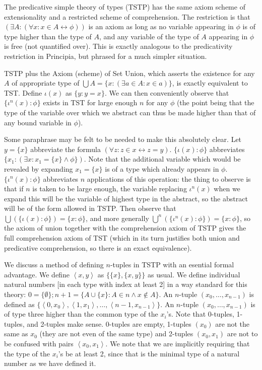 \documentclass[12pt]{article}
\begin{document}
The predicative simple theory of types (TSTP) has the same axiom scheme of extensionality and a restricted scheme of comprehension.  The restriction is that $(\exists A:(\forall x:x\in A\leftrightarrow \phi))$ is an axiom as long as no variable
appearing in $\phi$ is of type higher than the type of $A$, and any variable of the type of $A$ appearing in $\phi$ is free (not quantified over).   This is exactly analogous to the predicativity restriction in Principia, but phrased for a much simpler situation.

TSTP plus the Axiom (scheme) of Set Union, which asserts the existence for any $A$ of appropriate type of $\bigcup A = \{x:(\exists a \in A:x \in a)\}$, is exactly equivalent to TST.  Define $\iota(x)$ as $\{y:y=x\}$.  We can then conveniently
observe that $\{\iota^n(x):\phi\}$ exists in TST for large enough $n$ for any $\phi$ (the point being that the type of the variable over which we abstract can thus be made higher than that of any bound variable in $\phi$).

Some paraphrase may be felt to be needed to make this absolutely clear.  Let $y=\{x\}$ abbreviate the formula
$(\forall z:z\in x \leftrightarrow z=y)$.  $\{\iota(x):\phi\}$ abbreviates $\{x_1:(\exists x:x_1 = \{x\} \wedge \phi\})$.  Note that the additional variable which would be revealed by expanding $x_1 = \{x\}$ is of a type which already appears in $\phi$.
$\{\iota^n(x):\phi\}$ abbreviates $n$ applications of this operation:  the thing to observe is that if $n$ is taken to be large enough, the variable replacing $\iota^n(x)$ when we expand this will be the variable of highest type in the abstract, so the abstract will be of the form allowed in TSTP.  Then observe that $\bigcup(\{\iota(x):\phi\}) = \{x:\phi\}$, and more generally
$\bigcup^n(\{\iota^n(x):\phi\}) = \{x:\phi\}$, so the axiom of union together with the comprehension axiom of TSTP
gives the full comprehension axiom of TST (which in its turn justifies both union and predicative comprehension, so there is an exact equivalence).

We discuss a method of defining $n$-tuples in TSTP with an esential formal advantage.  We define $\left<x,y\right>$ as
$\{\{x\},\{x,y\}\}$ as usual.  We define individual natural numbers [in each type with index at least 2]  in a way standard for this theory:  $0 = \{\emptyset\}; n+1 = \{A \cup \{x\}:A \in n \wedge x \not\in A\}$.  An $n$-tuple $(x_0,\ldots,x_{n-1})$ is defined as $\{\left<0,x_0\right>,\left<1,x_1\right>,\ldots,\left<{n-1},x_{n-1}\right>\}$.  An $n$-tuple $(x_0,\ldots,x_{n-1})$ is of type three higher than the common type of the $x_i$'s.  Note that 0-tuples, 1-tuples, and 2-tuples make sense.  0-tuples are empty, 1-tuples $(x_0)$ are not the same as $x_0$ (they are not even of the same type) and 2-tuples $(x_0,x_1)$ are not to be confused with pairs $\left<x_0,x_1\right>$.  We note that we are implicitly requiring that the type of the $x_i$'s be at least 2, since that is the minimal type of a natural number as we have defined it.
\end{document}
